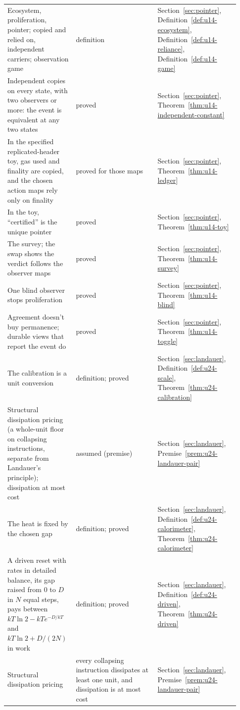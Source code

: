 \documentclass[11pt,twoside]{article}
\theoremstyle{thielethm}
\theoremstyle{thieledef}
\theoremstyle{thieledef}
\theoremstyle{thieledef}
\theoremstyle{thielethm}
\theoremstyle{thieleobs}
\theoremstyle{thielethm}
\begin{document}
\begin{longtable}{@{}>{\raggedright\arraybackslash}p{0.242\linewidth}>{\raggedright\arraybackslash}p{0.344\linewidth}>{\raggedright\arraybackslash}p{0.344\linewidth}@{}}
Ecosystem, proliferation, pointer; copied and relied on, independent carriers; observation game & definition & Section~\ref{sec:pointer}, Definition~\ref{def:u14-ecosystem}, Definition~\ref{def:u14-reliance}, Definition~\ref{def:u14-game} \\
Independent copies on every state, with two observers or more: the event is equivalent at any two states & proved & Section~\ref{sec:pointer}, Theorem~\ref{thm:u14-independent-constant} \\
In the specified replicated-header toy, gas used and finality are copied, and the chosen action maps rely only on finality & proved for those maps & Section~\ref{sec:pointer}, Theorem~\ref{thm:u14-ledger} \\
In the toy, ``certified'' is the unique pointer & proved & Section~\ref{sec:pointer}, Theorem~\ref{thm:u14-toy} \\
The survey; the swap shows the verdict follows the observer maps & proved & Section~\ref{sec:pointer}, Theorem~\ref{thm:u14-survey} \\
One blind observer stops proliferation & proved & Section~\ref{sec:pointer}, Theorem~\ref{thm:u14-blind} \\
Agreement doesn't buy permanence; durable views that report the event do & proved & Section~\ref{sec:pointer}, Theorem~\ref{thm:u14-toggle} \\
The calibration is a unit conversion & definition; proved & Section~\ref{sec:landauer}, Definition~\ref{def:u24-scale}, Theorem~\ref{thm:u24-calibration} \\
Structural dissipation pricing (a whole-unit floor on collapsing instructions, separate from Landauer's principle); dissipation at most cost & assumed (premise) & Section~\ref{sec:landauer}, Premise~\ref{prem:u24-landauer-pair} \\
The heat is fixed by the chosen gap & definition; proved & Section~\ref{sec:landauer}, Definition~\ref{def:u24-calorimeter}, Theorem~\ref{thm:u24-calorimeter} \\
A driven reset with rates in detailed balance, its gap raised from 0 to $D$ in $N$ equal steps, pays between $kT \ln 2 - kT e^{-D/kT}$ and $kT \ln 2 + D/(2N)$ in work & definition; proved & Section~\ref{sec:landauer}, Definition~\ref{def:u24-driven}, Theorem~\ref{thm:u24-driven} \\
Structural dissipation pricing & every collapsing instruction dissipates at least one unit, and dissipation is at most cost & Section~\ref{sec:landauer}, Premise~\ref{prem:u24-landauer-pair} \\

\end{longtable}
\end{document}
